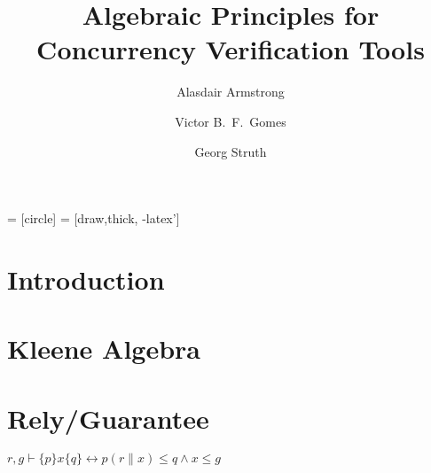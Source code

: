 \documentclass{llncs}
\begin{document}
 = [circle]
 = [draw,thick, -latex']

\title{Algebraic Principles for Concurrency Verification Tools}

\author{Alasdair Armstrong \and Victor B.~F.~Gomes \and Georg Struth}


\maketitle

\begin{abstract}
\end{abstract}

\pagestyle{plain}

\section{Introduction}

\cite{hoare_concurrent_2011}
\cite{kozen_completeness_1994}
\cite{kozen_kleene_1997}
\cite{armstrong_kleene_2013}
\cite{nipkow_isabelle/hol:_2002}

\newpage
\section{Kleene Algebra}

\newpage
\section{Rely/Guarantee}


$r, g \vdash \{p\}x\{q\} \longleftrightarrow p(r\|x)\le q \land x \le g$

\begin{prooftree}
\end{prooftree}

\begin{prooftree}
\end{prooftree}
\end{document}
